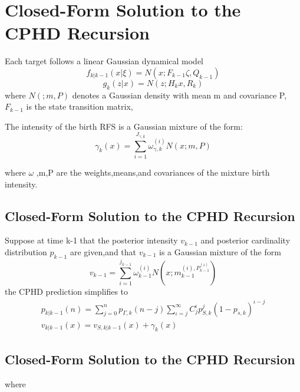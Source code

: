 \documentclass[
paper=128mm:96mm, %
fontsize=11pt, %
pagesize, %
parskip=half-, %
]{scrartcl} %
\theoremstyle{mythmstyle} %
\begin{document}
 \clearpage


\section{Closed-Form Solution to the CPHD Recursion}
Each target follows a linear Gaussian dynamical model
\begin{equation}
  f_{k|k-1}(x|\xi) = N(x;F_{k-1}\zeta,Q_{k-1})
\end{equation}
\begin{equation}
  g_{k}(z|x) = N(z;H_{k}x,R_k)
\end{equation}
where $N(;m,P)$ denotes a Gaussian density with mean m and covariance P,$F_{k-1}$ is the state transition matrix,


The intensity of the birth RFS is a Gaussian mixture of the form:
\begin{equation}
  \gamma_{k}(x) = \sum_{i=1}^{J_{\gamma,k}} \omega_{\gamma,k}^{(i)} N(x;m,P)
\end{equation}

where $\omega$ ,m,P are the weights,means,and covariances of the mixture birth intensity.
\clearpage
\subsection{Closed-Form Solution to the CPHD Recursion}
Suppose at time k-1 that the posterior intensity $v_{k-1}$ and posterior cardinality distribution $p_{k-1}$ are given,and that
$v_{k-1}$ is a Gaussian mixture of the form
\begin{equation}
   v_{k-1} = \sum_{i=1}^{j_{k-1}} \omega_{k-1}^{(i)}N(x;m_{k-1}^{(i),P_{k-1}^{(i)}})
\end{equation}
the CPHD prediction simplifies to
\begin{gather}
p_{k|k-1}(n) = \sum_{j=0}^{n} p_{\Gamma,k}(n-j) \sum_{\iota=j}^{\infty}C_{j}^{\iota}p_{S,k}^{j}{(1-p_{s,k})}^{\iota-j}\\
v_{k|k-1}(x)=v_{S,k|k-1}(x) + \gamma_{k}(x)
\end{gather}

\clearpage
\subsection{Closed-Form Solution to the CPHD Recursion}
where
\begin{equation}
\end{equation}
\end{document}
